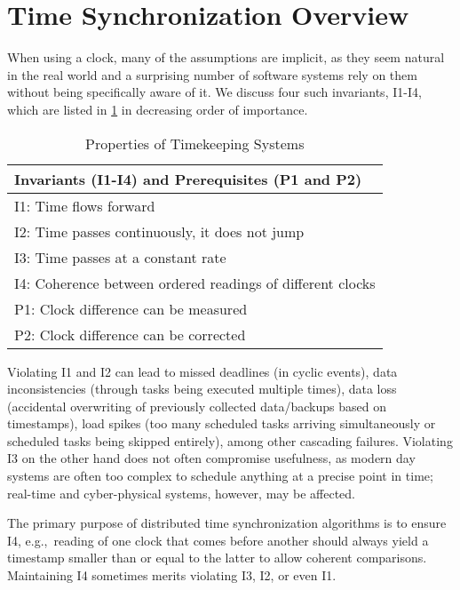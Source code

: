 \section{Time Synchronization Overview}
\label{sec:ptp-overview}
When using a clock, many of the assumptions are implicit,
as they seem natural in the real world and a surprising number of software
systems rely on them without being specifically aware of it.
We discuss four such invariants, I1-I4, which are listed in
\cref{tab:invariants} in decreasing order of importance.
\begin{table}
    \centering
    \caption{Properties of Timekeeping Systems}
    \begin{tabular}{l}
    \toprule
    \textbf{Invariants (I1-I4) and Prerequisites (P1 and P2)} \\
    \midrule
    I1: Time flows forward \\
    I2: Time passes continuously, it does not jump \\
    I3: Time passes at a constant rate \\
    I4: Coherence between ordered readings of different clocks  \\
    P1: Clock difference can be measured  \\
    P2: Clock difference can be corrected  \\
    \bottomrule
    \end{tabular}
    \label{tab:invariants}
\end{table}

Violating I1 and I2 can lead to missed deadlines (in cyclic events),
data inconsistencies (through tasks being executed multiple times),
data loss (accidental overwriting of previously collected data/backups based on timestamps),
load spikes (too many scheduled tasks arriving simultaneously or scheduled tasks being skipped entirely),
among other cascading failures.
Violating I3 on the other hand does not often compromise usefulness,
as modern day systems are often too complex to schedule anything at a precise
point in time; real-time and cyber-physical systems, however, may be affected.

The primary purpose of distributed time synchronization algorithms is to 
ensure I4,
e.g.,~reading of one clock that comes before another should
always yield a timestamp smaller than or equal to the latter to allow coherent
comparisons.
Maintaining I4 sometimes merits violating I3, I2, or even I1.

